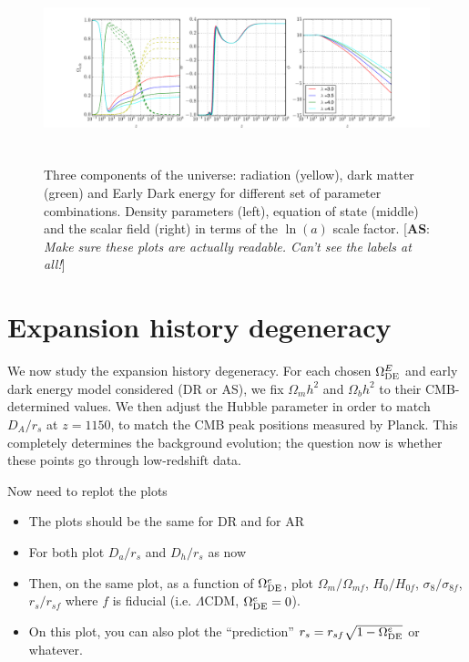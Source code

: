 \documentclass[preprintnumbers,amsmath,amssymb,prd,superscriptaddress,notitlepag
e, twocolumn]{revtex4-1}
\newcommand{\OmegaDE}{\Omega_{\rm DE}}
\def\as#1{[\textbf{AS}: \textit{#1}] }
\begin{document}
\begin{figure}[h!]
\hspace*{-0.in}
 \includegraphics[trim = 2mm 2mm 3mm 1mm, clip, width=20cm, height=5.5cm ]{Quint_vl_phi.pdf}
 \caption{  Three components of the universe: radiation (yellow), dark matter (green) 
 and Early Dark energy for different set of parameter combinations.
Density parameters (left), equation of state (middle) and the scalar
field (right) in terms of the $\ln(a)$ scale factor.
\as{Make sure these plots are actually readable. Can't see the labels
  at all!}
 }
 \label{fig:fig1}
\end{figure} 



\section{Expansion history degeneracy}


We now study the expansion history degeneracy. For each chosen
$\OmegaDE^E$ and early dark energy model considered (DR or AS), we fix
$\Omega_mh^2$ and $\Omega_bh^2$ to their CMB-determined values. We
then adjust the Hubble parameter in order to match $D_A/r_s$ at
$z=1150$, to match the CMB peak positions measured by Planck. This
completely determines the background evolution; the question now is
whether these points go through low-redshift data. 

Now need to replot the plots
\begin{itemize}
\item The plots should be the same for DR and for AR
\item For both plot $D_a/r_s$ and $D_h/r_s$ as now
\item Then, on the same plot, as a function of $\OmegaDE^e$, plot
  $\Omega_m/\Omega_{mf}$, $H_0/H_{0f}$, $\sigma_8/\sigma_{8f}$,
  $r_s/r_{sf}$ where $f$ is fiducial (i.e. $\Lambda$CDM,
  $\OmegaDE^e=0$).
\item On this plot, you can also plot the ``prediction''
  $r_s=r_{sf}\sqrt{1-\OmegaDE^e}$ or whatever.
\end{itemize}
\end{document}
